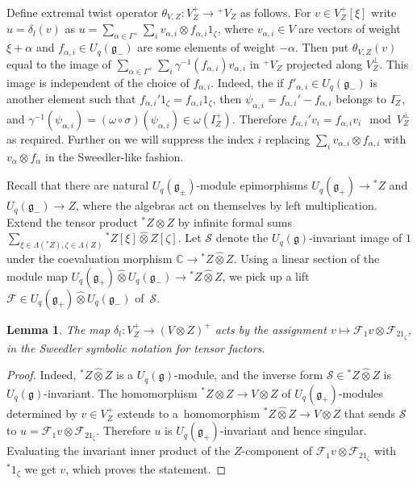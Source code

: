 \documentclass[pdftex]{sigma}
\numberwithin{equation}{section}
\newtheorem{Lemma}[Theorem]{Lemma}
\begin{document}
Define extremal twist operator $\theta_{V,Z}\colon V^+_Z\to {}^+\!V_Z$ as follows. For $v\in V^+_Z[\xi]$ write $u=\delta_l(v)$ as $u=\sum_{\alpha\in \Gamma^+}\sum_i v_{\alpha,i}\otimes f_{\alpha,i} 1_\zeta$, where $v_{\alpha,i}\in V$ are vectors of weight $\xi+\alpha$ and $f_{\alpha,i}\in U_q(\mathfrak{g}_-)$ are some elements of weight $-\alpha$. Then put $\theta_{V,Z}(v)$ equal to the image of $\sum_{\alpha\in \Gamma^+}\sum_{i}\gamma^{-1}(f_{\alpha,i})v_{\alpha,i}$ in ${}^+\!V_Z$ projected along $V^\perp_Z$. This image is independent of the choice of $f_{\alpha,i}$. Indeed, the if $f'_{\alpha,i}\in U_q(\mathfrak{g}_-)$ is another element such that $f_{\alpha,i}'1_\zeta=f_{\alpha,i}1_\zeta$, then $\psi_{\alpha,i}=f_{\alpha,i}'-f_{\alpha,i}$ belongs to $I^-_Z$, and $\gamma^{-1}(\psi_{\alpha,i})=(\omega \circ \sigma) (\psi_{\alpha,i})\in \omega(I^+_Z)$. Therefore $f_{\alpha,i}'v_i=f_{\alpha,i}v_i \mod V^\perp_Z$ as required. Further on we will suppress the index $i$ replacing $\sum_iv_{\alpha,i}\otimes f_{\alpha,i}$ with $ v_{\alpha}\otimes f_{\alpha}$ in the Sweedler-like fashion.

Recall that there are natural $U_q(\mathfrak{g}_\pm)$-module epimorphisms $U_q(\mathfrak{g}_+)\to {}^*\!Z$ and $U_q(\mathfrak{g}_-)\to Z$, where the algebras act on themselves by left multiplication. Extend the tensor product ${}^*\!Z\otimes Z$ by infinite formal sums $\sum_{\xi\in \Lambda({}^*\!Z), \zeta\in \Lambda(Z)}{}^*\!Z[\xi]\hat \otimes Z[\zeta]$. Let $\mathcal{S}$ denote the $U_q(\mathfrak{g})$-invariant image of $1$ under the coevaluation morphism $\mathbb{C}\to {}^*\!Z\hat \otimes Z$. Using a linear section of the module map $U_q(\mathfrak{g}_+)\hat \otimes U_q(\mathfrak{g}_-)\to {}^*\!Z\hat \otimes Z$, we pick up a lift $\mathcal{F}\in U_q(\mathfrak{g}_+)\hat \otimes U_q(\mathfrak{g}_-)$ of~$\mathcal{S}$.
\begin{Lemma}The map $\delta_l\colon V^+_Z\to (V\otimes Z)^+$ acts by the assignment $v\mapsto \mathcal{F}_1v\otimes \mathcal{F}_21_\zeta$, in the Sweedler symbolic notation for tensor factors.
\end{Lemma}
\begin{proof} Indeed, ${}^*\!Z\hat \otimes Z$ is a $U_q(\mathfrak{g})$-module, and the inverse form $\mathcal{S}\in {}^*\!Z\hat \otimes Z$ is $U_q(\mathfrak{g})$-invariant. The homomorphism ${}^*\!Z \otimes Z\to V\otimes Z$ of $U_q(\mathfrak{g}_+)$-modules determined by $v\in V^+_Z$ extends to a~homomorphism ${}^*\!Z\hat \otimes Z\to V\otimes Z$ that sends $\mathcal{S}$ to $u=\mathcal{F}_1v\otimes \mathcal{F}_21_\zeta$. Therefore $u$ is $U_q(\mathfrak{g}_+)$-invariant and hence singular. Evaluating the invariant inner product of the $Z$-component of $\mathcal{F}_1v\otimes \mathcal{F}_21_\zeta$ with ${}^*\!1_\zeta$ we get $v$, which proves the statement.
\end{proof}
\end{document}
